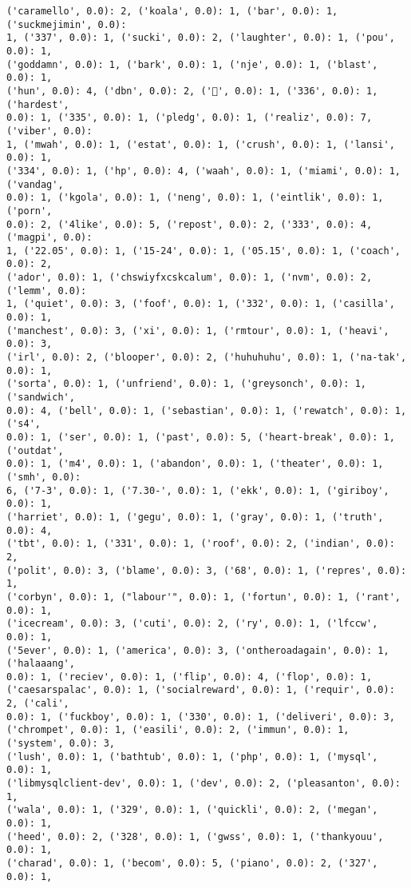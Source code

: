 \documentclass[11pt]{article}
\begin{document}
\begin{Verbatim}[commandchars=\\\{\}]
('caramello', 0.0): 2, ('koala', 0.0): 1, ('bar', 0.0): 1, ('suckmejimin', 0.0):
1, ('337', 0.0): 1, ('sucki', 0.0): 2, ('laughter', 0.0): 1, ('pou', 0.0): 1,
('goddamn', 0.0): 1, ('bark', 0.0): 1, ('nje', 0.0): 1, ('blast', 0.0): 1,
('hun', 0.0): 4, ('dbn', 0.0): 2, ('🎀', 0.0): 1, ('336', 0.0): 1, ('hardest',
0.0): 1, ('335', 0.0): 1, ('pledg', 0.0): 1, ('realiz', 0.0): 7, ('viber', 0.0):
1, ('mwah', 0.0): 1, ('estat', 0.0): 1, ('crush', 0.0): 1, ('lansi', 0.0): 1,
('334', 0.0): 1, ('hp', 0.0): 4, ('waah', 0.0): 1, ('miami', 0.0): 1, ('vandag',
0.0): 1, ('kgola', 0.0): 1, ('neng', 0.0): 1, ('eintlik', 0.0): 1, ('porn',
0.0): 2, ('4like', 0.0): 5, ('repost', 0.0): 2, ('333', 0.0): 4, ('magpi', 0.0):
1, ('22.05', 0.0): 1, ('15-24', 0.0): 1, ('05.15', 0.0): 1, ('coach', 0.0): 2,
('ador', 0.0): 1, ('chswiyfxcskcalum', 0.0): 1, ('nvm', 0.0): 2, ('lemm', 0.0):
1, ('quiet', 0.0): 3, ('foof', 0.0): 1, ('332', 0.0): 1, ('casilla', 0.0): 1,
('manchest', 0.0): 3, ('xi', 0.0): 1, ('rmtour', 0.0): 1, ('heavi', 0.0): 3,
('irl', 0.0): 2, ('blooper', 0.0): 2, ('huhuhuhu', 0.0): 1, ('na-tak', 0.0): 1,
('sorta', 0.0): 1, ('unfriend', 0.0): 1, ('greysonch', 0.0): 1, ('sandwich',
0.0): 4, ('bell', 0.0): 1, ('sebastian', 0.0): 1, ('rewatch', 0.0): 1, ('s4',
0.0): 1, ('ser', 0.0): 1, ('past', 0.0): 5, ('heart-break', 0.0): 1, ('outdat',
0.0): 1, ('m4', 0.0): 1, ('abandon', 0.0): 1, ('theater', 0.0): 1, ('smh', 0.0):
6, ('7-3', 0.0): 1, ('7.30-', 0.0): 1, ('ekk', 0.0): 1, ('giriboy', 0.0): 1,
('harriet', 0.0): 1, ('gegu', 0.0): 1, ('gray', 0.0): 1, ('truth', 0.0): 4,
('tbt', 0.0): 1, ('331', 0.0): 1, ('roof', 0.0): 2, ('indian', 0.0): 2,
('polit', 0.0): 3, ('blame', 0.0): 3, ('68', 0.0): 1, ('repres', 0.0): 1,
('corbyn', 0.0): 1, ("labour'", 0.0): 1, ('fortun', 0.0): 1, ('rant', 0.0): 1,
('icecream', 0.0): 3, ('cuti', 0.0): 2, ('ry', 0.0): 1, ('lfccw', 0.0): 1,
('5ever', 0.0): 1, ('america', 0.0): 3, ('ontheroadagain', 0.0): 1, ('halaaang',
0.0): 1, ('reciev', 0.0): 1, ('flip', 0.0): 4, ('flop', 0.0): 1,
('caesarspalac', 0.0): 1, ('socialreward', 0.0): 1, ('requir', 0.0): 2, ('cali',
0.0): 1, ('fuckboy', 0.0): 1, ('330', 0.0): 1, ('deliveri', 0.0): 3,
('chrompet', 0.0): 1, ('easili', 0.0): 2, ('immun', 0.0): 1, ('system', 0.0): 3,
('lush', 0.0): 1, ('bathtub', 0.0): 1, ('php', 0.0): 1, ('mysql', 0.0): 1,
('libmysqlclient-dev', 0.0): 1, ('dev', 0.0): 2, ('pleasanton', 0.0): 1,
('wala', 0.0): 1, ('329', 0.0): 1, ('quickli', 0.0): 2, ('megan', 0.0): 1,
('heed', 0.0): 2, ('328', 0.0): 1, ('gwss', 0.0): 1, ('thankyouu', 0.0): 1,
('charad', 0.0): 1, ('becom', 0.0): 5, ('piano', 0.0): 2, ('327', 0.0): 1,

\end{Verbatim}
\end{document}
